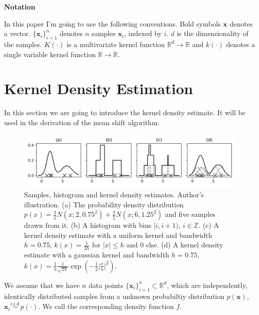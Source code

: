 \documentclass{article}
\begin{document}
\textbf{Notation}

In this paper I'm going to use the following conventions. Bold symbols $\bm{x}$ denotes a vector. $\{ \bm{x}_i \}_{i=1}^n$ denotes $n$ samples $\bm{x}_i$, indexed by $i$. $d$ is the dimensionality of the samples. $K(\cdot)$ is a multivariate kernel function $\mathbb{R}^d \rightarrow \mathbb{R}$ and $k(\cdot)$ denotes a single variable kernel function $\mathbb{R} \rightarrow \mathbb{R}$.


\section{Kernel Density Estimation}

In this section we are going to introduce the kernel density estimate. It will be used in the derivation of the mean shift algorithm.

\begin{figure}
	\includegraphics[width=\textwidth]{figures/kde-kernel-density-estimates}
	\caption[Samples, histogram and kernel density estimates]{Samples, histogram and kernel density estimates. Author's illustration.
		(a) The probability density distribution $p(x) = \frac{3}{5} N(x; 2, 0.75^2) + \frac{2}{5} N(x; 6, 1.25^2)$ and five samples drawn from it.
		(b) A histogram with bins $[i,i+1)$, $i \in \mathbb{Z}$.
		(c) A kernel density estimate with a uniform kernel and bandwidth $h=0.75$, $k(x) = \frac{1}{2h}$ for $\lvert x \rvert \leq h$ and $0$ else.
		(d) A kernel density estimate with a gaussian kernel and bandwidth $h=0.75$, $k(x) = \frac{1}{h} \frac{1}{\sqrt{2\pi}} \exp(-\frac{1}{2} \lvert \frac{x}{h} \rvert^2)$.
	}
	\label{fig:kde-kernel-density-estimates}
\end{figure}


We assume that we have $n$ data points $\{\bm{x}_i\}_{i=1}^n \subset \mathbb{R}^d$, which are independently, identically distributed samples from a unknown probabiltiy distribution $p(\bm{x})$, $\bm{x}_i \overset{i.i.d.}{\sim} p(\cdot)$. We call the corresponding density function $f$. 
\end{document}

